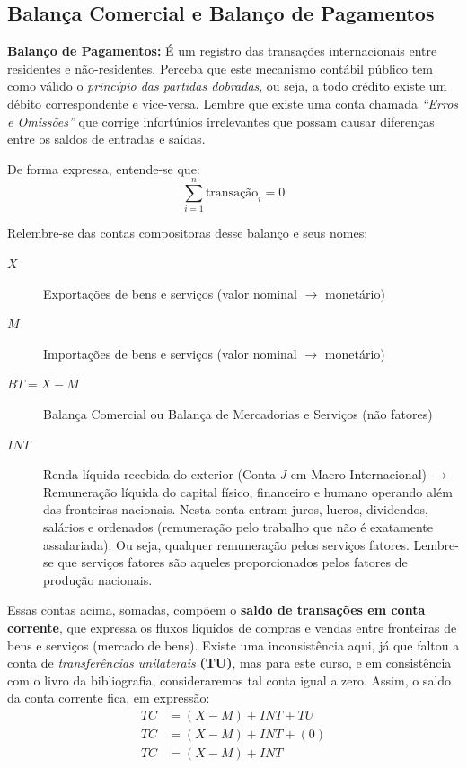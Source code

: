 \documentclass[a4paper,12pt]{article}[abntex2]
\begin{document}
\subsection{\textbf{Balança Comercial e Balanço de Pagamentos}}

\textbf{Balanço de Pagamentos:} É um registro das transações internacionais entre residentes e não-residentes.  
Perceba que este mecanismo contábil público tem como válido o \emph{princípio das partidas dobradas}, ou seja,  
a todo crédito existe um débito correspondente e vice-versa.  
Lembre que existe uma conta chamada \textit{“Erros e Omissões”} que corrige infortúnios irrelevantes que possam causar diferenças entre os saldos de entradas e saídas.

De forma expressa, entende-se que:
\[
\sum_{i=1}^{n}\text{transação}_{i}=0
\]

Relembre-se das contas compositoras desse balanço e seus nomes:
\begin{description}
  \item[$X$] Exportações de bens e serviços (valor nominal $\rightarrow$ monetário)
  \item[$M$] Importações de bens e serviços (valor nominal $\rightarrow$ monetário)
  \item[$BT=X-M$] Balança Comercial ou Balança de Mercadorias e Serviços (não fatores)
  \item[$INT$] Renda líquida recebida do exterior (Conta \emph{J} em Macro Internacional)  
        $\rightarrow$ Remuneração líquida do capital físico, financeiro e humano operando além das fronteiras nacionais.  
        Nesta conta entram juros, lucros, dividendos, salários e ordenados (remuneração pelo trabalho que não é exatamente assalariada).  
        Ou seja, qualquer remuneração pelos serviços fatores.  
        Lembre-se que serviços fatores são aqueles proporcionados pelos fatores de produção nacionais.
\end{description}

Essas contas acima, somadas, compõem o \textbf{saldo de transações em conta corrente}, que expressa os fluxos líquidos de compras e vendas entre fronteiras de bens e serviços (mercado de bens).  
Existe uma inconsistência aqui, já que faltou a conta de \emph{transferências unilaterais} \textbf{ (TU)}, mas para este curso,  
e em consistência com o livro da bibliografia, consideraremos tal conta igual a zero.  
Assim, o saldo da conta corrente fica, em expressão:
\[
\begin{aligned}
TC &= (X-M)+INT+TU\\
TC &= (X-M)+INT+(0)\\
TC &= (X-M)+INT
\end{aligned}
\]
\end{document}
